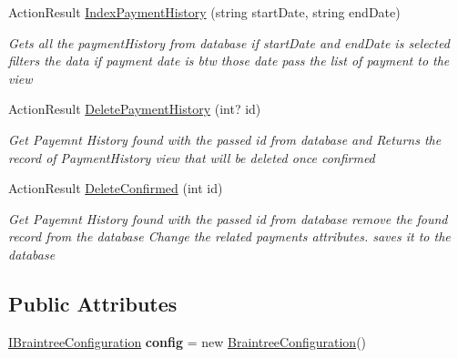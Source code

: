 \begin{DoxyCompactItemize}
Action\+Result \hyperlink{class_alfa_accounting_1_1_controllers_1_1_booking_view_models_controller_a174254ecf6118ecb99bd0cb915ae4514}{Index\+Payment\+History} (string start\+Date, string end\+Date)
\begin{DoxyCompactList}\small\item\em Gets all the payment\+History from database if start\+Date and end\+Date is selected filters the data if payment date is btw those date pass the list of payment to the view \end{DoxyCompactList}\item 
Action\+Result \hyperlink{class_alfa_accounting_1_1_controllers_1_1_booking_view_models_controller_a3b0b28c4b3de440bbaab4d0179bf5944}{Delete\+Payment\+History} (int? id)
\begin{DoxyCompactList}\small\item\em Get Payemnt History found with the passed id from database and Returns the record of Payment\+History view that will be deleted once confirmed \end{DoxyCompactList}\item 
Action\+Result \hyperlink{class_alfa_accounting_1_1_controllers_1_1_booking_view_models_controller_a8134c914666bdbb144ad94b15d1f84e6}{Delete\+Confirmed} (int id)
\begin{DoxyCompactList}\small\item\em Get Payemnt History found with the passed id from database remove the found record from the database Change the related payments attributes. saves it to the database \end{DoxyCompactList}\end{DoxyCompactItemize}
\subsection*{Public Attributes}
\begin{DoxyCompactItemize}
\item 
\mbox{\label{class_alfa_accounting_1_1_controllers_1_1_booking_view_models_controller_af681755383e06aa0a5df31136be68926}} 
\hyperlink{interface_alfa_accounting_1_1_controllers_1_1_i_braintree_configuration}{I\+Braintree\+Configuration} {\bfseries config} = new \hyperlink{class_alfa_accounting_1_1_controllers_1_1_braintree_configuration}{Braintree\+Configuration}()
\end{DoxyCompactItemize}
